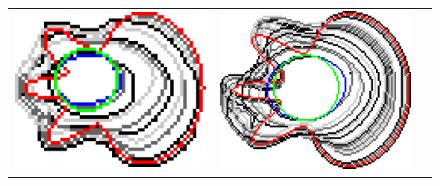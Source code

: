 \begin{figure}[hp!]
\begin{tabular}{ccc}
	
	\includegraphics[scale=0.25]{figures/chapter5/flow/flower/radius_5/ii/elastica/len_pen_0.01000/jonctions_1/curve_segs_4/best/gs_1.00000/summary.pdf} &		
	
	\includegraphics[scale=0.25]{figures/chapter5/flow/flower/radius_5/ii/elastica/len_pen_0.01000/jonctions_1/curve_segs_4/best/gs_0.50000/summary.pdf} &


\end{tabular}
\end{figure}
